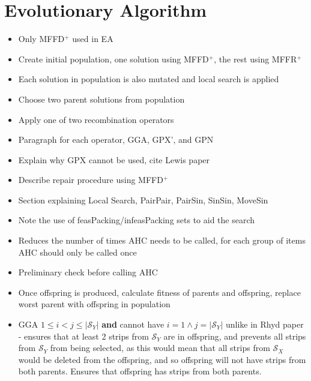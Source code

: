 \documentclass{elsarticle}
\begin{document}
\section{Evolutionary Algorithm}
\begin{itemize}
	\item Only MFFD$^+$ used in EA
	\item Create initial population, one solution using MFFD$^+$, the rest using MFFR$^+$
	\item Each solution in population is also mutated and local search is applied
	\item Choose two parent solutions from population
	\item Apply one of two recombination operators
	\item Paragraph for each operator, GGA, GPX', and GPN
	\item Explain why GPX cannot be used, cite Lewis paper
	\item Describe repair procedure using MFFD$^+$
	\item Section explaining Local Search, PairPair, PairSin, SinSin, MoveSin
	\item Note the use of feasPacking/infeasPacking sets to aid the search
	\item Reduces the number of times AHC needs to be called, for each group of items AHC should only be called once
	\item Preliminary check before calling AHC
	\item Once offspring is produced, calculate fitness of parents and offspring, replace worst parent with offspring in population
	\item GGA $1 \leq i < j \leq |\mathcal{S}_Y|$ \textbf{and} cannot have $i = 1 \land j = |\mathcal{S}_Y|$ unlike in Rhyd paper - ensures that at least 2 strips from $\mathcal{S}_Y$ are in offspring, and prevents all strips from $\mathcal{S}_Y$ from being selected, as this would mean that all strips from $\mathcal{S}_X$ would be deleted from the offspring, and so offspring will not have strips from both parents. Ensures that offspring has strips from both parents.
\end{itemize}
\end{document}
